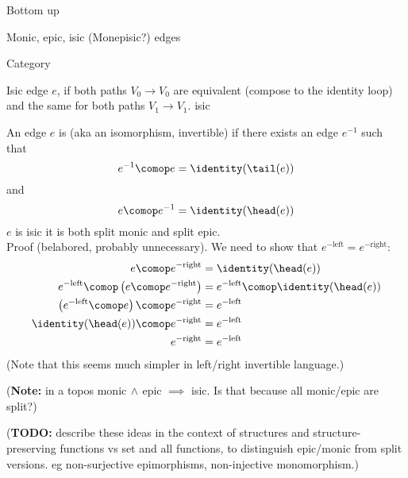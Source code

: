 \begin{plSection}{Bottom up}
\begin{plSection}{Monic, epic, isic (Monepisic?) edges}
\begin{plSection}{Category}
\begin{plDiagram}
{Isic edge $e$, if both paths $V_0 \longrightarrow V_0$
are equivalent (compose to the identity loop) and the 
same for both paths $V_1 \longrightarrow V_1$.}
{isic}
\centering
{}
\end{plDiagram}

An edge $e$ is  (aka an isomorphism, invertible)
if there exists an edge $e^{-1}$ such that
\[
e^{-1} \comop e = \identity(\tail(e))
\]
and
\[
e \comop e^{-1} = \identity(\head(e))
\]
$e$ is isic \liff it is both split monic and split epic.\\
Proof (belabored, probably unnecessary).
We need to show that $e^{-\text{left}} = e^{-\text{right}}$:
\begin{align*}
e \comop e^{-\text{right}} 
& = 
\identity(\head(e)) 
\\
e^{-\text{left}} \comop \left( e \comop e^{-\text{right}} \right)
& = 
e^{-\text{left}} \comop \identity(\head(e)) 
\\
\left( e^{-\text{left}} \comop e \right) \comop e^{-\text{right}} 
& = 
e^{-\text{left}}
\\
\identity(\head(e)) \comop e^{-\text{right}} 
& = 
e^{-\text{left}} 
\\
e^{-\text{right}} 
& = 
e^{-\text{left}} 
\end{align*}
(Note that this seems much simpler in left/right invertible language.)

(\textbf{Note:} in a topos monic$\,\wedge\,$epic $\implies$ isic.
Is that because all monic/epic are split?)

(\textbf{TODO:} describe these ideas in the context of
structures and structure-preserving functions vs
set and all functions, to distinguish epic/monic from split versions.
eg non-surjective epimorphisms, non-injective monomorphism.)


\end{plSection}
\end{plSection}
\end{plSection}
